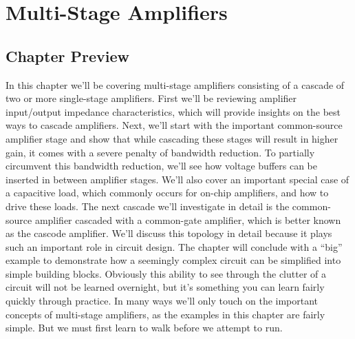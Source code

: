 \chapter{Multi-Stage Amplifiers}
\label{ch:ch15_multi_stage_amps}
\graphicspath{{./figs_multistage/}}
\newcommand{\topicA}{Review Amplifier Input/Output Impedance Characteristics}
\newcommand{\topicB}{Common-Source Cascades}
\newcommand{\topicC}{Common-Source with Capacitive Load}
\newcommand{\topicD}{Common-Source Common-Gate Cascade (Cascode)}
\newcommand{\topicE}{``Big Circuit" Example}
\section{Chapter Preview}
In this chapter we'll be covering multi-stage amplifiers consisting of a cascade of two or more single-stage amplifiers.  First we'll be reviewing amplifier input/output impedance characteristics, which will provide insights on the best ways to cascade amplifiers.  Next, we'll start with the important common-source amplifier stage and show that while cascading these stages will result in higher gain, it comes with a severe penalty of bandwidth reduction.  To partially circumvent this bandwidth reduction, we'll see how voltage buffers can be inserted in between amplifier stages.  We'll also cover an important special case of a capacitive load, which commonly occurs for on-chip amplifiers, and how to drive these loads.  The next cascade we'll investigate in detail is the common-source amplifier cascaded with a common-gate amplifier, which is better known as the cascode amplifier.  We'll discuss this topology in detail because it plays such an important role in circuit design.  The chapter will conclude with a ``big'' example to demonstrate how a seemingly complex circuit can be simplified into simple building blocks.  Obviously this ability to see through the clutter of a circuit will not be learned overnight, but it's something you can learn fairly quickly through practice.  In many ways we'll only touch on the important concepts of multi-stage amplifiers, as the examples in this chapter are fairly simple.  But we must first learn to walk before we attempt to run.
